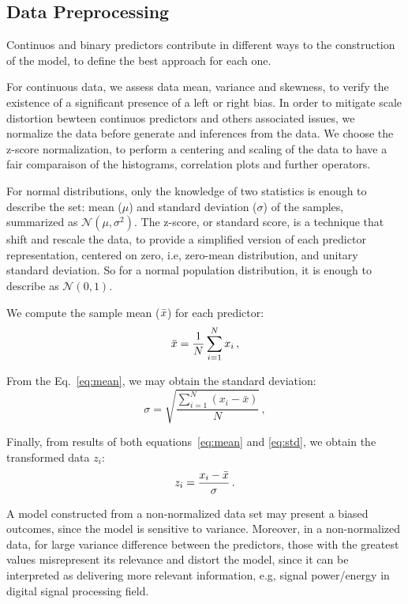 \subsection{Data Preprocessing}

Continuos and binary predictors contribute in different ways to the construction of the model, to define the best approach for each one. 

For continuous data, we assess data mean, variance and skewness, to verify the existence of a significant presence of a left or right bias. In order to mitigate scale distortion bewteen continuos predictors and others associated issues, we normalize the data before generate and inferences from the data. We choose the z-score normalization, to perform a centering and scaling of the data to have a fair comparaison of the histograms, correlation plots and further operators. 

For normal distributions, only the knowledge of two statistics is enough to describe the set: mean ($\mu$) and standard deviation ($\sigma$) of the samples, summarized as $\mathcal{N}(\mu, \sigma^2)$. The z-score, or standard score, is a technique that shift and rescale the data, to provide a simplified version of each predictor representation, centered on zero, i.e, zero-mean distribution, and unitary standard deviation. So for a normal population distribution, it is enough to describe as $\mathcal{N}(0, 1)$.

We compute the sample mean ($\Bar{x}$) for each predictor:
\begin{equation}
  \Bar{x} = \frac{1}{N} \sum_{i=1}^{N} x_i \, , \label{eq:mean}
\end{equation}

From the Eq.~\ref{eq:mean}, we may obtain the standard deviation:
\begin{equation}
  \sigma = \sqrt{\frac{\sum_{i=1}^{N} (x_i - \bar{x})}{N}} \, , \label{eq:std}
\end{equation}

Finally, from results of both equations~\ref{eq:mean} and \ref{eq:std}, we obtain the transformed data $z_i$:
\begin{equation}
  z_i = \frac{x_i - \Bar{x}}{\sigma} \, .
\end{equation}

A model constructed from a non-normalized data set may present a biased outcomes, since the model is sensitive to variance. Moreover, in a non-normalized data, for large variance difference between the predictors, those with the greatest values misrepresent its relevance and distort the model, since it can be interpreted as delivering more relevant information, e.g, signal power/energy in digital signal processing field.

